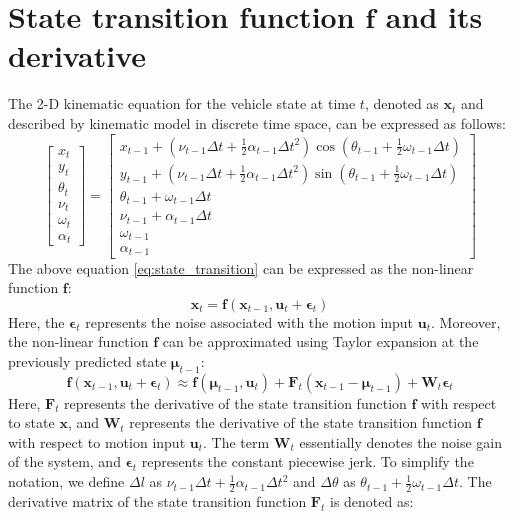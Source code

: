 \documentclass[12pt, a4paper]{article}
\begin{document}
\section{State transition function $\bm{f}$ and its derivative}
The 2-D kinematic equation for the vehicle state at time $t$, denoted as $\bm{x}_t$ and described by kinematic model in discrete time space, can be expressed as follows:
\begin{equation}
  \label{eq:state_transition}
  \begin{bmatrix}
    x_{t}\\
    y_{t}\\
    \theta_{t}\\
    \nu_{t}\\
    \omega_{t}\\
    \alpha_{t}
  \end{bmatrix}=
  \begin{bmatrix}
    x_{t-1} + (\nu_{t-1}\Delta t + \frac{1}{2}\alpha_{t-1}\Delta t^2) \cos(\theta_{t-1}+\frac{1}{2}\omega_{t-1}\Delta t)\\
    y_{t-1} + (\nu_{t-1}\Delta t + \frac{1}{2}\alpha_{t-1}\Delta t^2) \sin(\theta_{t-1}+\frac{1}{2}\omega_{t-1}\Delta t)\\
    \theta_{t-1} + \omega_{t-1}\Delta t\\
    \nu_{t-1} + \alpha_{t-1} \Delta t\\
    \omega_{t-1}\\
    \alpha_{t-1}
  \end{bmatrix}
\end{equation}
The above equation \eqref{eq:state_transition} can be expressed as the non-linear function $\bm{f}$:
\[
  \bm{x}_{t} = \bm{f}(\bm{x}_{t-1}, \bm{u}_{t}+\bm{\epsilon}_{t})
\]
Here, the $\bm{\epsilon}_{t}$ represents the noise associated with the motion input $\bm{u}_{t}$. Moreover, the non-linear function $\bm{f}$ can be approximated using Taylor expansion at the previously predicted state $\bm{\mu}_{t-1}$:
\[
  \bm{f}(\bm{x}_{t-1}, \bm{u}_{t} + \bm{\epsilon}_{t}) \approx \bm{f}(\bm{\mu}_{t-1}, \bm{u}_{t})+\bm{F}_{t}(\bm{x}_{t-1}-\bm{\mu}_{t-1})+\bm{W}_{t}\bm{\epsilon}_{t}
\]
Here, $\bm{F}_{t}$ represents the derivative of the state transition function $\bm{f}$ with respect to state $\bm{x}$, and $\bm{W}_{t}$ represents the derivative of the state transition function $\bm{f}$ with respect to motion input $\bm{u}_{t}$. The term $\bm{W}_{t}$ essentially denotes the noise gain of the system, and $\bm{\epsilon}_{t}$ represents the constant piecewise jerk. To simplify the notation, we define $\Delta l$ as $\nu_{t-1}\Delta t + \frac{1}{2}\alpha_{t-1}\Delta t^2$ and $\Delta\theta$ as $\theta_{t-1} + \frac{1}{2}\omega_{t-1}\Delta t$. The derivative matrix of the state transition function $\bm{F}_{t}$ is denoted as:
\end{document}

